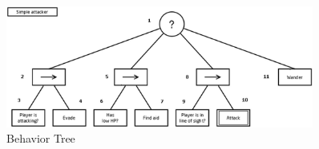 \begin{figure}[htb]
    \centering
    \includegraphics[width=0.9\textwidth]{images/behavior_tree.png}
    \caption{Behavior Tree\cite{marcotte2017behavior}}
    \label{figure:behavior_tree}
\end{figure}